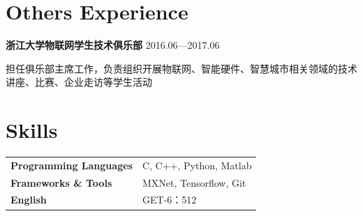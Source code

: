 \documentclass{article}
\begin{document}
\section*{Others Experience}
\vspace{-1.3\baselineskip}
\noindent\hrulefill


\par \large \textbf{浙江大学物联网学生技术俱乐部}  \hfill 2016.06—2017.06
\linespread{1.6}\selectfont %

\linespread{1.2}\selectfont %
\par 担任俱乐部主席工作，负责组织开展物联网、智能硬件、智慧城市相关领域的技术讲座、比赛、企业走访等学生活动



\section*{Skills}
\vspace{-1.3\baselineskip}
\noindent\hrulefill

\begin{tabular}{ll}
\large \textbf{Programming Languages} & C, C++, Python, Matlab \\
\large \textbf{Frameworks \& Tools} & MXNet, Tensorflow, Git \\
\large \textbf{English} &  GET-6：512 \\
\end{tabular}
\end{document}
